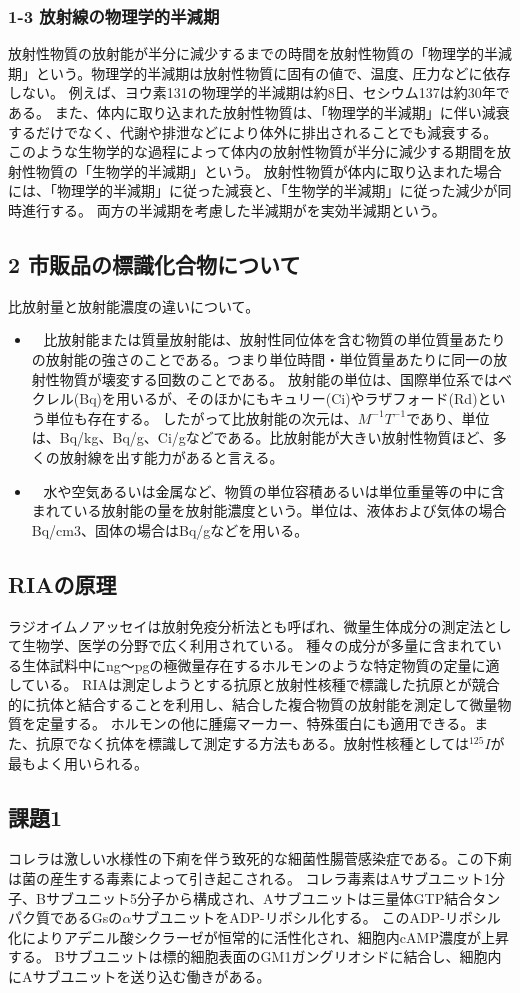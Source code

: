 \documentclass[a4paper,papersize,dvipdfmx]{jsarticle}
\newcommand{\mon}[1]{\item[({#1})] \ }
\begin{document}
\subsubsection*{1-3 放射線の物理学的半減期}
放射性物質の放射能が半分に減少するまでの時間を放射性物質の「物理学的半減期」という。物理学的半減期は放射性物質に固有の値で、温度、圧力などに依存しない。
例えば、ヨウ素131の物理学的半減期は約8日、セシウム137は約30年である。
また、体内に取り込まれた放射性物質は、「物理学的半減期」に伴い減衰するだけでなく、代謝や排泄などにより体外に排出されることでも減衰する。
このような生物学的な過程によって体内の放射性物質が半分に減少する期間を放射性物質の「生物学的半減期」という。
放射性物質が体内に取り込まれた場合には、「物理学的半減期」に従った減衰と、「生物学的半減期」に従った減少が同時進行する。
両方の半減期を考慮した半減期がを実効半減期という。
\subsection*{2 市販品の標識化合物について}
比放射量と放射能濃度の違いについて。
\begin{itemize}
\mon{2-1}
比放射能または質量放射能は、放射性同位体を含む物質の単位質量あたりの放射能の強さのことである。つまり単位時間・単位質量あたりに同一の放射性物質が壊変する回数のことである。
放射能の単位は、国際単位系ではベクレル(Bq)を用いるが、そのほかにもキュリー(Ci)やラザフォード(Rd)という単位も存在する。
したがって比放射能の次元は、$M^{-1}T^{-1}$であり、単位は、Bq/kg、Bq/g、Ci/gなどである。比放射能が大きい放射性物質ほど、多くの放射線を出す能力があると言える。
\mon{2-2}
水や空気あるいは金属など、物質の単位容積あるいは単位重量等の中に含まれている放射能の量を放射能濃度という。単位は、液体および気体の場合Bq/cm3、固体の場合はBq/gなどを用いる。
\end{itemize}
\subsection*{RIAの原理}
ラジオイムノアッセイは放射免疫分析法とも呼ばれ、微量生体成分の測定法として生物学、医学の分野で広く利用されている。
種々の成分が多量に含まれている生体試料中にng〜pgの極微量存在するホルモンのような特定物質の定量に適している。
RIAは測定しようとする抗原と放射性核種で標識した抗原とが競合的に抗体と結合することを利用し、結合した複合物質の放射能を測定して微量物質を定量する。
ホルモンの他に腫瘍マーカー、特殊蛋白にも適用できる。また、抗原でなく抗体を標識して測定する方法もある。放射性核種としては$^{125}I$が最もよく用いられる。
\subsection*{課題1}
コレラは激しい水様性の下痢を伴う致死的な細菌性腸菅感染症である。この下痢は菌の産生する毒素によって引き起こされる。
コレラ毒素はAサブユニット1分子、Bサブユニット5分子から構成され、Aサブユニットは三量体GTP結合タンパク質であるGsの$\alpha$サブユニットをADP-リボシル化する。
このADP-リボシル化によりアデニル酸シクラーゼが恒常的に活性化され、細胞内cAMP濃度が上昇する。
Bサブユニットは標的細胞表面のGM1ガングリオシドに結合し、細胞内にAサブユニットを送り込む働きがある。
\end{document}

